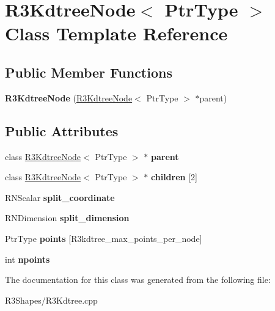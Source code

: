 \hypertarget{class_r3_kdtree_node}{}\section{R3\+Kdtree\+Node$<$ Ptr\+Type $>$ Class Template Reference}
\label{class_r3_kdtree_node}
\subsection*{Public Member Functions}
\begin{DoxyCompactItemize}
\item 
{\bfseries R3\+Kdtree\+Node} (\hyperlink{class_r3_kdtree_node}{R3\+Kdtree\+Node}$<$ Ptr\+Type $>$ $\ast$parent)\hypertarget{class_r3_kdtree_node_a7aeb80b0a277c8040969ba8ba8c0eb38}{}\label{class_r3_kdtree_node_a7aeb80b0a277c8040969ba8ba8c0eb38}

\end{DoxyCompactItemize}
\subsection*{Public Attributes}
\begin{DoxyCompactItemize}
\item 
class \hyperlink{class_r3_kdtree_node}{R3\+Kdtree\+Node}$<$ Ptr\+Type $>$ $\ast$ {\bfseries parent}\hypertarget{class_r3_kdtree_node_a79dc1ff436b75ba025e30b5e3cf06d88}{}\label{class_r3_kdtree_node_a79dc1ff436b75ba025e30b5e3cf06d88}

\item 
class \hyperlink{class_r3_kdtree_node}{R3\+Kdtree\+Node}$<$ Ptr\+Type $>$ $\ast$ {\bfseries children} \mbox{[}2\mbox{]}\hypertarget{class_r3_kdtree_node_afa41740e80ed0c6a1489d2248aca4b92}{}\label{class_r3_kdtree_node_afa41740e80ed0c6a1489d2248aca4b92}

\item 
R\+N\+Scalar {\bfseries split\+\_\+coordinate}\hypertarget{class_r3_kdtree_node_aed32d7540a11373e95df26a623fa809b}{}\label{class_r3_kdtree_node_aed32d7540a11373e95df26a623fa809b}

\item 
R\+N\+Dimension {\bfseries split\+\_\+dimension}\hypertarget{class_r3_kdtree_node_a050aeed874e25104563982f156d0668e}{}\label{class_r3_kdtree_node_a050aeed874e25104563982f156d0668e}

\item 
Ptr\+Type {\bfseries points} \mbox{[}R3kdtree\+\_\+max\+\_\+points\+\_\+per\+\_\+node\mbox{]}\hypertarget{class_r3_kdtree_node_ad862d833cd1a8c6a0908c9d59953fd33}{}\label{class_r3_kdtree_node_ad862d833cd1a8c6a0908c9d59953fd33}

\item 
int {\bfseries npoints}\hypertarget{class_r3_kdtree_node_adb0cf9c3e1c98e642115f160a5fe7891}{}\label{class_r3_kdtree_node_adb0cf9c3e1c98e642115f160a5fe7891}

\end{DoxyCompactItemize}


The documentation for this class was generated from the following file\+:\begin{DoxyCompactItemize}
\item 
R3\+Shapes/R3\+Kdtree.\+cpp\end{DoxyCompactItemize}
